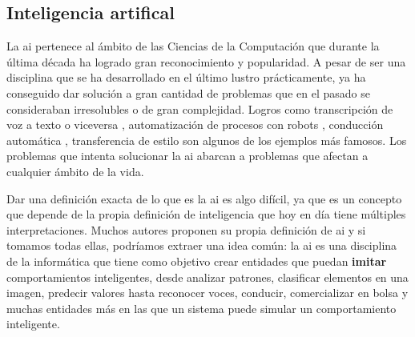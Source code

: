 \subsection{Inteligencia artifical}

La \acrfull{ai} pertenece al ámbito de las Ciencias de la Computación que durante la última década ha logrado gran reconocimiento y popularidad. A pesar de ser una disciplina que se ha desarrollado en el último lustro prácticamente, ya ha conseguido dar solución a gran cantidad de problemas que en el pasado se consideraban irresolubles o de gran complejidad. Logros como transcripción de voz a texto \cite{voice2text} o viceversa \cite{text2voice}, automatización de procesos con robots \cite{robots}, conducción automática \cite{automaticdriving}, transferencia de estilo \cite{styletransfer} son algunos de los ejemplos más famosos. Los problemas que intenta solucionar la \acrshort{ai} abarcan a problemas que afectan a cualquier ámbito de la vida.
\newline

Dar una definición exacta de lo que es la \acrshort{ai} es algo difícil, ya que es un concepto que depende de la propia definición de inteligencia que hoy en día tiene múltiples interpretaciones. Muchos autores proponen su propia definición de \acrshort{ai} \cite{haugeland, bellman, charniak, winston, kurzweil, knight, nilsson} y si tomamos todas ellas, podríamos extraer una idea común: la \acrshort{ai} es una disciplina de la informática que tiene como objetivo crear entidades que puedan \textbf{imitar} comportamientos inteligentes, desde analizar patrones, clasificar elementos en una imagen, predecir valores hasta reconocer voces, conducir, comercializar en bolsa y muchas entidades más en las que un sistema puede simular un comportamiento inteligente. 
\newline


